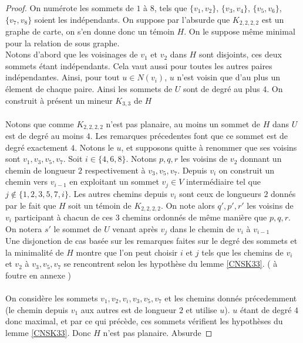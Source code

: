 \documentclass{scrartcl}
\begin{document}
\begin{flushleft}
\begin{proof}
    On numérote les sommets de $1$ à $8$, tels que $\{v_1,v_2\}$, $\{v_3,v_4\}$, $\{v_5,v_6\}$, $\{v_7,v_8\}$ soient les indépendants.
    On suppose par l'absurde que $K_{2,2,2,2}$ est un graphe de carte, on s'en donne donc un témoin $H$. On le suppose même minimal pour
    la relation de sous graphe.\\
    Notons d'abord que les voisinages de $v_1$ et $v_2$ dans $H$ sont disjoints, ces deux sommets étant indépendants. Cela vaut
    aussi pour toutes les autres paires indépendantes. Ainsi, pour tout $u \in N(v_i)$, $u$ n'est voisin que d'au plus un élement de
    chaque paire. Ainsi les sommets de $U$ sont de degré au plus $4$. On construit à présent un mineur $K_{3,3}$ de $H$
    \\~\\
    Notons que comme $K_{2,2,2,2}$ n'est pas planaire, au moins un sommet de $H$ dans $U$ est de degré au moins $4$. Les remarques
    précedentes font que ce sommet est de degré exactement $4$. Notons le $u$, et supposons quitte à renommer que ses voisins
    sont $v_1, v_3, v_5, v_7$. Soit $i \in \{4, 6, 8\}$. Notons $p, q, r$ les voisins de $v_2$ donnant un chemin de longueur
    $2$ respectivement à $v_3, v_5, v_7$. Depuis $v_i$ on construit un chemin vers $v_{i-1}$ en exploitant un sommet $v_j \in V$ intermédiaire
    tel que $j \notin \{1, 2, 3, 5, 7, i\}$. Les autres chemins depuis $v_i$ sont ceux de longueurs $2$ donnés par le fait que $H$ soit
    un témoin de $K_{2,2,2,2}$. On note alors $q', p', r'$ les voisins de $v_i$ participant à chacun de ces $3$ chemins
    ordonnés de même manière que $p, q, r$. On notera $s'$ le sommet de $U$ venant après $v_j$ dans le chemin de $v_i$ à $v_{i-1}$\\
    Une disjonction de cas basée sur les remarques faites sur le degré des sommets et la minimalité de $H$ montre
    que l'on peut choisir $i$ et $j$ tels que les chemins de $v_i$ et $v_2$ à $v_3, v_5, v_7$ se rencontrent selon
    les hypothèse du lemme \ref{CNSK33}. ( à foutre en annexe )
    \\~\\
    On considère les sommets $v_1, v_2, v_i, v_3, v_5, v_7$ et les chemins donnés précedemment (le chemin depuis $v_1$ aux autres est de longueur
    $2$ et utilise $u$). $u$ étant de degré $4$ donc maximal, et par ce qui précède, ces sommets vérifient les hypothèses du lemme
    \ref{CNSK33}. Donc $H$ n'est pas planaire. Absurde
\end{proof}


\end{flushleft}
\end{document}
